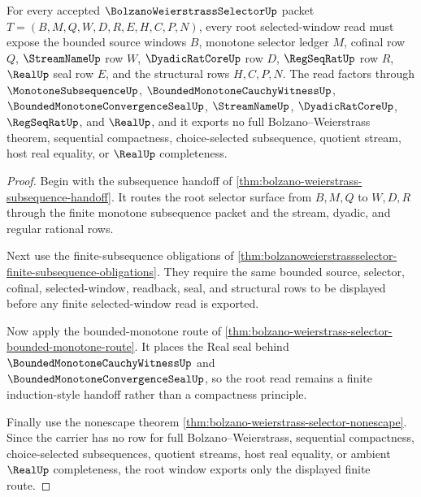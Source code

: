 \begin{theorem}
\label{thm:bolzano-weierstrass-selector-root-window}
For every accepted $\BolzanoWeierstrassSelectorUp$ packet $T=(B,M,Q,W,D,R,E,H,C,P,N)$, every root selected-window read must expose the bounded source windows $B$, monotone selector ledger $M$, cofinal row $Q$, $\StreamNameUp$ row $W$, $\DyadicRatCoreUp$ row $D$, $\RegSeqRatUp$ row $R$, $\RealUp$ seal row $E$, and the structural rows $H,C,P,N$. The read factors through $\MonotoneSubsequenceUp$, $\BoundedMonotoneCauchyWitnessUp$, $\BoundedMonotoneConvergenceSealUp$, $\StreamNameUp$, $\DyadicRatCoreUp$, $\RegSeqRatUp$, and $\RealUp$, and it exports no full Bolzano--Weierstrass theorem, sequential compactness, choice-selected subsequence, quotient stream, host real equality, or $\RealUp$ completeness.
\end{theorem}
\begin{proof}
Begin with the subsequence handoff of \autoref{thm:bolzano-weierstrass-subsequence-handoff}. It routes the root selector surface from $B,M,Q$ to $W,D,R$ through the finite monotone subsequence packet and the stream, dyadic, and regular rational rows.

Next use the finite-subsequence obligations of \autoref{thm:bolzanoweierstrassselector-finite-subsequence-obligations}. They require the same bounded source, selector, cofinal, selected-window, readback, seal, and structural rows to be displayed before any finite selected-window read is exported.

Now apply the bounded-monotone route of \autoref{thm:bolzano-weierstrass-selector-bounded-monotone-route}. It places the Real seal behind $\BoundedMonotoneCauchyWitnessUp$ and $\BoundedMonotoneConvergenceSealUp$, so the root read remains a finite induction-style handoff rather than a compactness principle.

Finally use the nonescape theorem \autoref{thm:bolzano-weierstrass-selector-nonescape}. Since the carrier has no row for full Bolzano--Weierstrass, sequential compactness, choice-selected subsequences, quotient streams, host real equality, or ambient $\RealUp$ completeness, the root window exports only the displayed finite route.
\end{proof}

